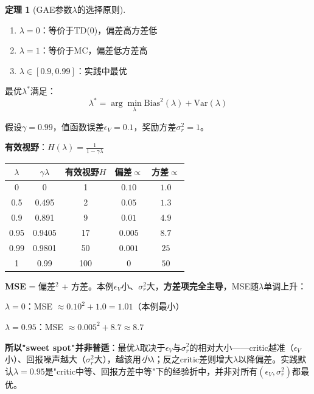 \documentclass[11pt,a4paper]{article}
\theoremstyle{definition}
\newtheorem{theorem}{定理}[section]
\begin{document}
\begin{theorem}[GAE参数$\lambda$的选择原则]
\begin{enumerate}
    \item $\lambda = 0$：等价于TD(0)，偏差高方差低
    \item $\lambda = 1$：等价于MC，偏差低方差高
    \item $\lambda \in [0.9, 0.99]$：实践中最优
\end{enumerate}

最优$\lambda^*$满足：
\[
\lambda^* = \arg\min_\lambda \text{Bias}^2(\lambda) + \text{Var}(\lambda)
\]
\end{theorem}

\begin{calculation}
假设$\gamma = 0.99$，值函数误差$\epsilon_V = 0.1$，奖励方差$\sigma_r^2 = 1$。

\textbf{有效视野}：$H(\lambda) = \frac{1}{1 - \gamma\lambda}$

\begin{center}
\begin{tabular}{c|c|c|c|c}
\toprule
$\lambda$ & $\gamma\lambda$ & 有效视野$H$ & 偏差$\propto$ & 方差$\propto$ \\
\midrule
0 & 0 & 1 & $0.10$ & $1.0$ \\
0.5 & 0.495 & 2 & $0.05$ & $1.3$ \\
0.9 & 0.891 & 9 & $0.01$ & $4.9$ \\
0.95 & 0.9405 & 17 & $0.005$ & $8.7$ \\
0.99 & 0.9801 & 50 & $0.001$ & $25$ \\
1 & 0.99 & 100 & $0$ & $50$ \\
\bottomrule
\end{tabular}
\end{center}

\textbf{MSE} = 偏差$^2$ + 方差。本例$\epsilon_V$小、$\sigma_r^2$大，\textbf{方差项完全主导}，MSE随$\lambda$单调上升：

$\lambda = 0$：MSE $\approx 0.10^2 + 1.0 = 1.01$（本例最小）

$\lambda = 0.95$：MSE $\approx 0.005^2 + 8.7 \approx 8.7$

\textbf{所以"sweet spot"并非普适}：最优$\lambda$取决于$\epsilon_V$与$\sigma_r^2$的相对大小——critic越准（$\epsilon_V$小）、回报噪声越大（$\sigma_r^2$大），越该用\emph{小}$\lambda$；反之critic差则增大$\lambda$以降偏差。实践默认$\lambda=0.95$是"critic中等、回报方差中等"下的经验折中，并非对所有$(\epsilon_V,\sigma_r^2)$都最优。
\end{calculation}
\end{document}
